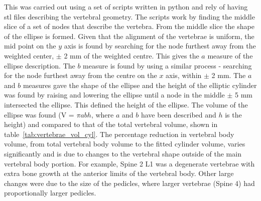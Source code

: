This was carried out using a set of scripts written in python and rely of having stl files describing the vertebral geometry.
The scripts work by finding the middle slice of a set of nodes that describe the vertebra.
From the middle slice the shape of the ellipse is formed.
Given that the alignment of the vertebrae is uniform, the mid point on the $y$ axis is found by searching for the node furthest away from the weighted center, $\pm$ 2 mm of the weighted centre.
This gives the $a$ measure of the ellipse description.
The $b$ measure is found by using a similar process - searching for the node furthest away from the centre on the $x$ axis, within $\pm$ 2 mm.
The $a$ and $b$ measures gave the shape of the ellipse and the height of the elliptic cylinder was found by raising and lowering the ellipse until a node in the middle $\pm$ 5 mm intersected the ellipse.
This defined the height of the ellipse.
The volume of the ellipse was found (V = $\pi a b h$, where $a$ and $b$ have been described and $h$ is the height) and compared to that of the total vertebral volume, shown in table~\ref{tab:vertebrae_vol_cyl}.
The percentage reduction in vertebral body volume, from total vertebral body volume to the fitted cylinder volume, varies significantly and is due to changes to the vertebral shape outside of the main vertebral body portion.
For example, Spine 2 L1 was a degenerate vertebrae with extra bone growth at the anterior limits of the vertebral body.
Other large changes were due to the size of the pedicles, where larger vertebrae (Spine 4) had proportionally larger pedicles.

